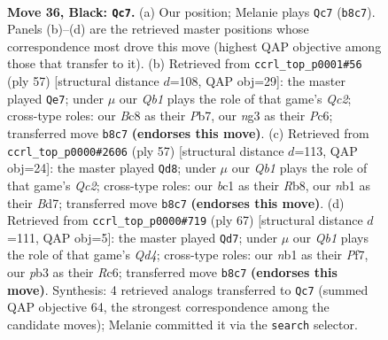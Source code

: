 \documentclass[11pt]{article}
\begin{document}
\clearpage

\begin{figure}[p]\centering
\begin{subfigure}{0.46\textwidth}\centering
\resizebox{\linewidth}{!}{%
\newchessgame
\chessboard[
  setfen={1qb3k1/p2n1r1p/1r3b2/2p2P2/Pp1p4/1P4N1/R3P1Q1/1NBK1R2 b - - 4 36},
  showmover=false,
  pgfstyle=straightmove, color=movearrow, markmove={b8-c7}
]}
\caption{}
\end{subfigure}\hfill
\begin{subfigure}{0.46\textwidth}\centering
\resizebox{\linewidth}{!}{%
\newchessgame
\chessboard[
  setfen={1r2r3/1pq3pk/2p3bp/P1Ppn3/1Q1N4/6P1/4BPP1/R4RK1 b - - 2 29},
  showmover=false,
  pgfstyle=straightmove, color=movearrow, markmove={c7-e7}
]}
\caption{}
\end{subfigure}
\\[4pt]
\begin{subfigure}{0.46\textwidth}\centering
\resizebox{\linewidth}{!}{%
\newchessgame
\chessboard[
  setfen={1r2n1k1/2qb1pp1/3pp2r/8/1n2PP1p/1PN1QN1P/1K1R2P1/R4B2 b - - 0 29},
  showmover=false,
  pgfstyle=straightmove, color=movearrow, markmove={c7-d8}
]}
\caption{}
\end{subfigure}\hfill
\begin{subfigure}{0.46\textwidth}\centering
\resizebox{\linewidth}{!}{%
\newchessgame
\chessboard[
  setfen={2r3k1/5pb1/1pr1n1p1/3q3p/1B1pN2P/P2P2P1/5P2/1R1QR1K1 b - - 5 34},
  showmover=false,
  pgfstyle=straightmove, color=movearrow, markmove={d5-d7}
]}
\caption{}
\end{subfigure}
\caption{\textbf{Move 36, Black: \texttt{Qc7}.} (a) Our position; Melanie plays \texttt{Qc7} (\texttt{b8c7}). Panels (b)--(d) are the retrieved master positions whose correspondence most drove this move (highest QAP objective among those that transfer to it). (b) Retrieved from \texttt{ccrl\_top\_p0001\#56} (ply 57) [structural distance $d$=108, QAP obj=29]: the master played \texttt{Qe7}; under $\mu$ our \emph{Qb1} plays the role of that game's \emph{Qc2}; cross-type roles: our \emph{B}c8 as their \emph{P}b7, our \emph{n}g3 as their \emph{P}c6; transferred move \texttt{b8c7} \textbf{(endorses this move)}. (c) Retrieved from \texttt{ccrl\_top\_p0000\#2606} (ply 57) [structural distance $d$=113, QAP obj=24]: the master played \texttt{Qd8}; under $\mu$ our \emph{Qb1} plays the role of that game's \emph{Qc2}; cross-type roles: our \emph{b}c1 as their \emph{R}b8, our \emph{n}b1 as their \emph{B}d7; transferred move \texttt{b8c7} \textbf{(endorses this move)}. (d) Retrieved from \texttt{ccrl\_top\_p0000\#719} (ply 67) [structural distance $d$=111, QAP obj=5]: the master played \texttt{Qd7}; under $\mu$ our \emph{Qb1} plays the role of that game's \emph{Qd4}; cross-type roles: our \emph{n}b1 as their \emph{P}f7, our \emph{p}b3 as their \emph{R}c6; transferred move \texttt{b8c7} \textbf{(endorses this move)}. Synthesis: 4 retrieved analogs transferred to \texttt{Qc7} (summed QAP objective 64, the strongest correspondence among the candidate moves); Melanie committed it via the \texttt{search} selector.}
\label{fig:thought-m71}
\end{figure}
\end{document}
